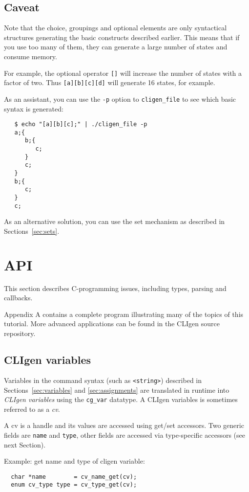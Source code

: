 \documentclass[a4paper, 10pt] {article}
\begin{document}
\subsection{Caveat}

Note that the choice, groupings and optional elements are only
syntactical structures generating the basic constructs described
earlier. This means that if you use too many of them, they can
generate a large number of states and consume memory.

For example, the optional operator {\tt []} will increase the number of states with a
factor of two. Thus {\tt [a][b][c][d]} will generate 16 states, for
example.

As an assistant, you can use the {\tt -p} option to {\tt cligen\_file} to see which basic syntax is generated:
\begin{verbatim}
   $ echo "[a][b][c];" | ./cligen_file -p
   a;{
      b;{
         c;
      }
      c;
   }
   b;{
      c;
   }
   c;
\end{verbatim}

As an alternative solution, you can use the set mechanism as described in Sections~\ref{sec:sets}.

\section{API}
\label{sec:api}
This section describes C-programming issues, including types, parsing and
callbacks.

Appendix A contains a complete program illustrating many of the topics
of this tutorial.  More advanced applications can be found in the CLIgen
source repository.

\subsection{CLIgen variables}

Variables in the command syntax (such as {\tt <string>}) described in
Sections~\ref{sec:variables} and \ref{sec:assignments} are translated
in runtime into \emph{CLIgen variables} using the {\tt cg\_var}
datatype.  A CLIgen variables is sometimes referred to as a \emph{cv}.

A cv is a handle and its values are accessed using get/set
accessors. Two generic fields are {\tt name} and {\tt type}, other
fields are accessed via type-specific accessors (see next Section).

Example: get name and type of cligen variable:
\begin{verbatim}
  char *name        = cv_name_get(cv);
  enum cv_type type = cv_type_get(cv);
\end{verbatim}
\end{document}
